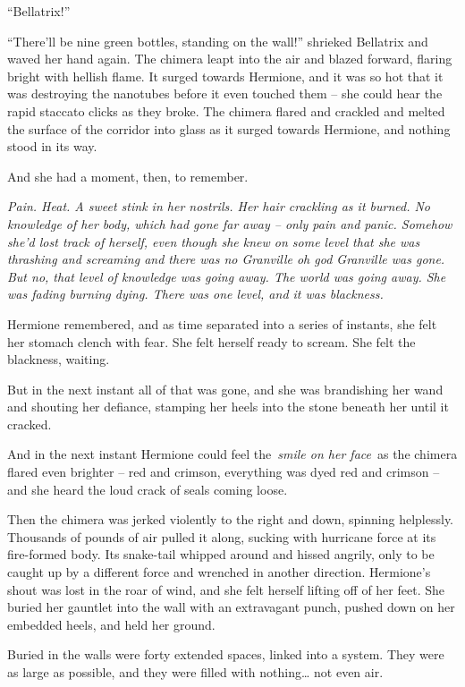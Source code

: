 ``Bellatrix!''

``There'll be nine green bottles, standing on the wall!'' shrieked
Bellatrix and waved her hand again. The chimera leapt into the air and
blazed forward, flaring bright with hellish flame. It surged towards
Hermione, and it was so hot that it was destroying the nanotubes before
it even touched them -- she could hear the rapid staccato clicks as they
broke. The chimera flared and crackled and melted the surface of the
corridor into glass as it surged towards Hermione, and nothing stood in
its way.

And she had a moment, then, to remember.

\emph{Pain. Heat. A sweet stink in her nostrils. Her hair crackling as
it burned. No knowledge of her body, which had gone far away -- only
pain and panic. Somehow she'd lost track of herself, even though she
knew on some level that she was thrashing and screaming and there was no
Granville oh god Granville was gone. But no, that level of knowledge was
going away. The world was going away. She was fading burning dying.
There was one level, and it was blackness.}

Hermione remembered, and as time separated into a series of instants,
she felt her stomach clench with fear. She felt herself ready to scream.
She felt the blackness, waiting.

But in the next instant all of that was gone, and she was brandishing
her wand and shouting her defiance, stamping her heels into the stone
beneath her until it cracked.

And in the next instant Hermione could feel the~\emph{smile on her
face}~as the chimera flared even brighter -- red and crimson, everything
was dyed red and crimson -- and she heard the loud crack of seals coming
loose.

Then the chimera was jerked violently to the right and down, spinning
helplessly. Thousands of pounds of air pulled it along, sucking with
hurricane force at its fire-formed body. Its snake-tail whipped around
and hissed angrily, only to be caught up by a different force and
wrenched in another direction. Hermione's shout was lost in the roar of
wind, and she felt herself lifting off of her feet. She buried her
gauntlet into the wall with an extravagant punch, pushed down on her
embedded heels, and held her ground.

Buried in the walls were forty extended spaces, linked into a system.
They were as large as possible, and they were filled with
nothing\ldots{} not even air.

